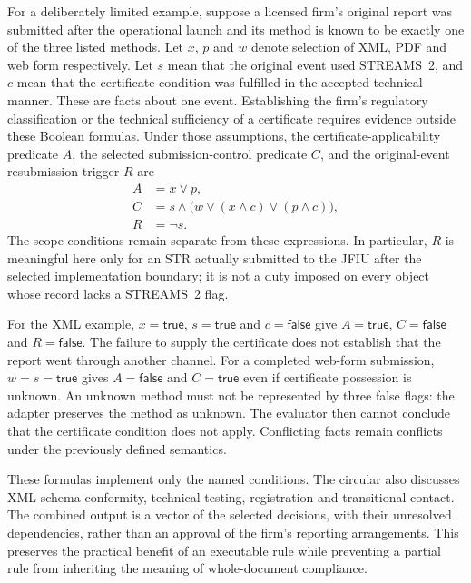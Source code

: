 \documentclass[12pt,a4paper,oneside,openany]{book}
\begin{document}
For a deliberately limited example, suppose a licensed firm's original report
was submitted after the operational launch and its method is known to be exactly
one of the three listed methods. Let $x$, $p$ and $w$ denote selection of XML,
PDF and web form respectively. Let $s$ mean that the original event used
STREAMS~2, and $c$ mean that the certificate condition was fulfilled in the
accepted technical manner. These are facts about one event. Establishing the
firm's regulatory classification or the technical sufficiency of a certificate
requires evidence outside these Boolean formulas. Under those assumptions, the
certificate-applicability predicate $A$, the selected submission-control
predicate $C$, and the original-event resubmission trigger $R$ are
\begin{align}
 A &= x \lor p,\label{eq:str-certificate-applicability}\\
 C &= s \land \bigl(w \lor (x\land c) \lor (p\land c)\bigr),\label{eq:str-selected-submission}\\
 R &= \neg s.\label{eq:str-resubmission-trigger}
\end{align}
The scope conditions remain separate from these expressions. In particular,
$R$ is meaningful here only for an STR actually submitted to the JFIU after the
selected implementation boundary; it is not a duty imposed on every object
whose record lacks a STREAMS~2 flag.

For the XML example, $x=\mathsf{true}$, $s=\mathsf{true}$ and
$c=\mathsf{false}$ give $A=\mathsf{true}$, $C=\mathsf{false}$ and
$R=\mathsf{false}$. The failure to supply the certificate does not establish
that the report went through another channel. For a completed web-form
submission, $w=s=\mathsf{true}$ gives $A=\mathsf{false}$ and
$C=\mathsf{true}$ even if certificate possession is unknown. An unknown method
must not be represented by three false flags: the adapter preserves the method
as unknown. The evaluator then cannot conclude that the certificate condition
does not apply. Conflicting facts remain conflicts under the previously defined
semantics.

These formulas implement only the named conditions. The circular also discusses
XML schema conformity, technical testing, registration and transitional contact.
The combined output is a vector of the selected decisions, with their unresolved
dependencies, rather than an approval of the firm's reporting arrangements.
This preserves the practical benefit of an executable rule while preventing a
partial rule from inheriting the meaning of whole-document compliance.
\end{document}
